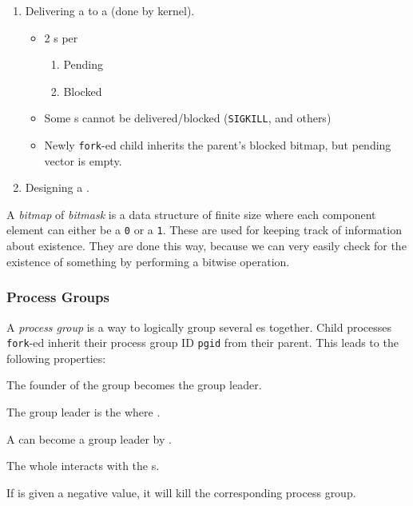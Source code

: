 \begin{enumerate}[noitemsep]
\item Delivering a  to a  (done by kernel).
  \begin{itemize}[noitemsep]
  \item 2 s per 
    \begin{enumerate}[noitemsep]
    \item Pending
    \item Blocked
    \end{enumerate}
  \item Some s cannot be delivered/blocked (\texttt{SIGKILL}, and others)
  \item Newly \texttt{fork}-ed child inherits the parent's blocked bitmap, but pending vector is empty.
  \end{itemize}

\item Designing a .
\end{enumerate}

\begin{definition}[Bitmap]\label{def:Bitmap}\label{def:Bitmask}
  A \emph{bitmap} of \emph{bitmask} is a data structure of finite size where each component element can either be a \texttt{0} or a \texttt{1}.
  These are used for keeping track of information about existence.
  They are done this way, because we can very easily check for the existence of something by performing a bitwise operation.
\end{definition}

\subsubsection{Process Groups}\label{subsubsec:Process_Groups}
\begin{definition}\label{def:Process_Group}
  A \emph{process group} is a way to logically group several es together.
  Child processes \texttt{fork}-ed inherit their process group ID \texttt{pgid} from their parent.
  This leads to the following properties:
  \begin{propertylist}
  \item The founder of the group becomes the group leader.
  \item The group leader is the  where .
  \item A  can become a group leader by .
  \item The whole  interacts with the s.
  \item If  is given a negative value, it will kill the corresponding process group.
  \end{propertylist}
\end{definition}

